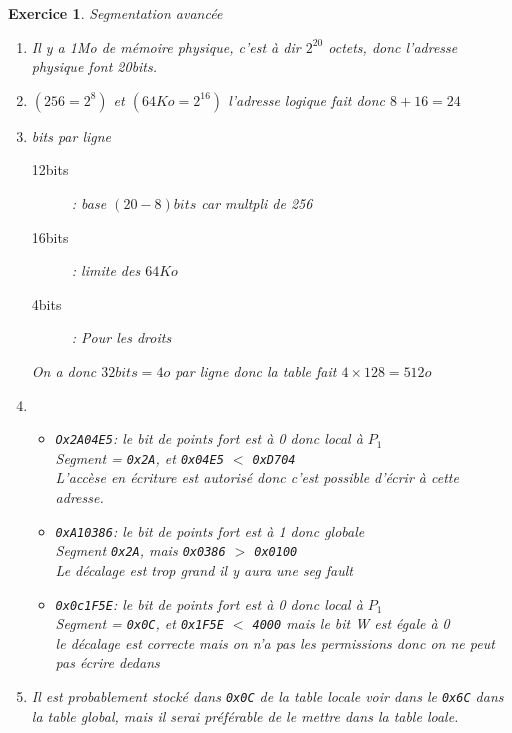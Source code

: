 \documentclass{article}
\theoremstyle{plain}
\newtheorem{exo}{Exercice}%
\begin{document}
\begin{exo} Segmentation avancée
\begin{enumerate}
    \item Il y a 1Mo de mémoire physique, c'est à dir $2^{20}$ octets, 
        donc l'adresse physique font 20bits.

    \item $(256=2^8)$ et $(64Ko=2^{16})$ l'adresse logique fait donc $8+16=24$
    
    \item bits par ligne 
    \begin{description}
        \item[12bits]: base $(20 - 8)bits$  car multpli de 256
        \item[16bits]: limite des $64Ko$ 
        \item[4bits]: Pour les droits 
    \end{description}
    On a donc $32bits = 4o$ par ligne donc la table fait $4 \times 128=512o$

    \item \begin{itemize}
        \item \verb/Ox2A04E5/: le bit de points fort est à 0 donc local à $P_1$\\
            Segment = \verb/0x2A/, et \verb/0x04E5/ $<$ \verb/0xD704/\\
            L'accèse en écriture est autorisé donc c'est possible d'écrir à cette adresse.
        \item \verb/0xA10386/: le bit de points fort est à 1 donc globale\\
            Segment \verb/0x2A/, mais \verb/0x0386/ $>$ \verb/0x0100/\\
            Le décalage est trop grand il y aura une seg fault
        \item  \verb/0x0c1F5E/: le bit de points fort est à 0 donc local à $P_1$\\
            Segment = \verb/0x0C/, et \verb/0x1F5E/ $<$ \verb/4000/ mais le bit W est égale à 0\\
            le décalage est correcte mais on n'a pas les permissions donc on ne peut pas écrire 
            dedans
    \end{itemize}

    \item Il est probablement stocké dans \verb/0x0C/ de la table locale voir dans le \verb/0x6C/ dans 
        la table global, mais il serai préférable de le mettre dans la table loale.


\end{enumerate}
\end{exo}
\end{document}
